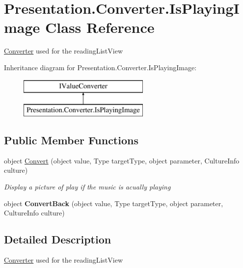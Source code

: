 \hypertarget{class_presentation_1_1_converter_1_1_is_playing_image}{}\section{Presentation.\+Converter.\+Is\+Playing\+Image Class Reference}
\label{class_presentation_1_1_converter_1_1_is_playing_image}


\hyperlink{namespace_presentation_1_1_converter}{Converter} used for the reading\+List\+View  


Inheritance diagram for Presentation.\+Converter.\+Is\+Playing\+Image\+:\begin{figure}[H]
\begin{center}
\leavevmode
\includegraphics[height=2.000000cm]{class_presentation_1_1_converter_1_1_is_playing_image}
\end{center}
\end{figure}
\subsection*{Public Member Functions}
\begin{DoxyCompactItemize}
\item 
object \hyperlink{class_presentation_1_1_converter_1_1_is_playing_image_ab6d06255e3f26f1011d65b86d507a881}{Convert} (object value, Type target\+Type, object parameter, Culture\+Info culture)
\begin{DoxyCompactList}\small\item\em Display a picture of play if the music is acually playing \end{DoxyCompactList}\item 
\mbox{\label{class_presentation_1_1_converter_1_1_is_playing_image_a14fcd97ce4a2cfd6eae063f7064f8e91}} 
object {\bfseries Convert\+Back} (object value, Type target\+Type, object parameter, Culture\+Info culture)
\end{DoxyCompactItemize}


\subsection{Detailed Description}
\hyperlink{namespace_presentation_1_1_converter}{Converter} used for the reading\+List\+View 



